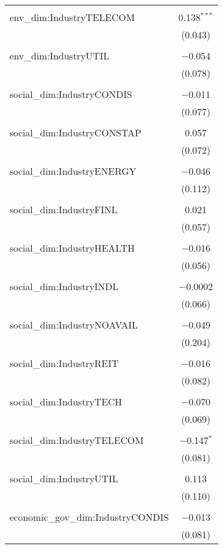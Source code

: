 \begin{table}[!htbp]
\begin{tabular}{@{\extracolsep{5pt}}lc}
  & \\ 
 env\_dim:IndustryTELECOM & 0.138$^{***}$ \\ 
  & (0.043) \\ 
  & \\ 
 env\_dim:IndustryUTIL & $-$0.054 \\ 
  & (0.078) \\ 
  & \\ 
 social\_dim:IndustryCONDIS & $-$0.011 \\ 
  & (0.077) \\ 
  & \\ 
 social\_dim:IndustryCONSTAP & 0.057 \\ 
  & (0.072) \\ 
  & \\ 
 social\_dim:IndustryENERGY & $-$0.046 \\ 
  & (0.112) \\ 
  & \\ 
 social\_dim:IndustryFINL & 0.021 \\ 
  & (0.057) \\ 
  & \\ 
 social\_dim:IndustryHEALTH & $-$0.016 \\ 
  & (0.056) \\ 
  & \\ 
 social\_dim:IndustryINDL & $-$0.0002 \\ 
  & (0.066) \\ 
  & \\ 
 social\_dim:IndustryNOAVAIL & $-$0.049 \\ 
  & (0.204) \\ 
  & \\ 
 social\_dim:IndustryREIT & $-$0.016 \\ 
  & (0.082) \\ 
  & \\ 
 social\_dim:IndustryTECH & $-$0.070 \\ 
  & (0.069) \\ 
  & \\ 
 social\_dim:IndustryTELECOM & $-$0.147$^{*}$ \\ 
  & (0.081) \\ 
  & \\ 
 social\_dim:IndustryUTIL & 0.113 \\ 
  & (0.110) \\ 
  & \\ 
 economic\_gov\_dim:IndustryCONDIS & $-$0.013 \\ 
  & (0.081) \\ 

\end{tabular}
\end{table}
